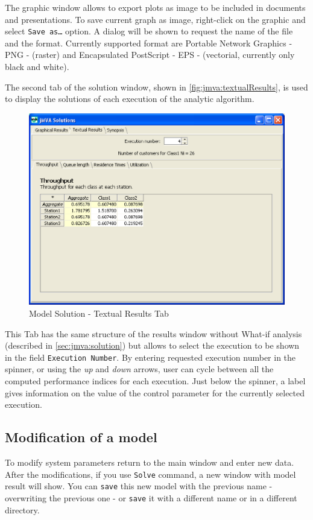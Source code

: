 The graphic window allows to export plots as image to be included in
documents and presentations. To save current graph as image,
right-click on the graphic and select \texttt{Save as\dots} option.
A dialog will be shown to request the name of the file and the
format. Currently supported format are Portable Network Graphics -
PNG - (raster) and Encapsulated PostScript - EPS - (vectorial,
currently only black and white).

The second tab of the solution window, shown in
\autoref{fig:jmva:textualResults}, is used to display the solutions
of each execution of the analytic algorithm.

\begin{figure}[htbp]
    \begin{center}
        \includegraphics[scale=.5]{img/jmva/textualResults}
    \end{center}
    \caption{Model Solution - Textual Results Tab}
    \label{fig:jmva:textualResults}
\end{figure}

This Tab has the same structure of the results window without
What-if analysis (described in \autoref{sec:jmva:solution}) but
allows to select the execution to be shown in the field
\texttt{Execution Number}. By entering requested execution number in
the spinner, or using the \emph{up} and \emph{down} arrows, user can
cycle between all the computed performance indices for each
execution. Just below the spinner, a label gives information on the
value of the control parameter for the currently selected execution.

\subsection{Modification of a model}
To modify system parameters return to the main window and enter new
data. After the modifications, if you use \texttt{Solve} command, a
new window with model result will show. You can \texttt{save} this
new model with the previous name - overwriting the previous one - or
\texttt{save} it with a different name or in a different directory.

